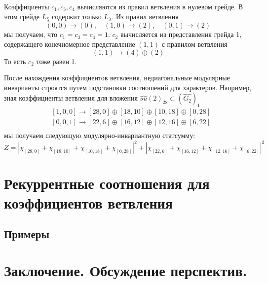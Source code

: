 \documentclass[a4paper,12pt]{article}
\theoremstyle{definition} \newtheorem{Def}{Definition}
\begin{document}
Коэффициенты $c_1, c_3, c_4$ вычисляются из правил ветвления в нулевом грейде. В этом грейде $L_{\hat\lambda}$ содержит только $L_{\lambda}$. Из правил ветвления
\begin{equation}
  \label{eq:18}
  (0,0)\to (0),\quad (1,0)\to (2),\quad (0,1)\to (2)
\end{equation}
мы получаем, что $c_1=c_3=c_4=1$. $c_2$ вычисляется из представления грейда 1, содержащего конечномерное представление $(1,1)$ с правилом ветвления
\begin{equation}
  \label{eq:19}
  (1,1)\to (4)\oplus (2)
\end{equation}
То есть $c_2$ тоже равен 1.

После нахождения коэффициентов ветвления, недиагональные модулярные инварианты строятся путем подстановки соотношений для характеров. Например, зная коэффициенты ветвления для вложения $\hat{su}(2)_{28}\subset (\hat{G_2})_1$
  \begin{equation}
    \label{eq:20}
    \begin{aligned}
      & [1,0,0]\to [28,0]\oplus [18,10]\oplus [10,18]\oplus [0,28]\\
      & [0,0,1]\to [22,6]\oplus [16,12]\oplus [12,16]\oplus [6,22]\\
    \end{aligned}
  \end{equation}
мы получаем следующую модулярно-инвариантную статсумму:
\begin{equation}
  \label{eq:21}
  Z=\left|\chi_{[28,0]}+\chi_{[18,10]}+\chi_{[10,18]}+\chi_{[0,28]}\right|^2+\left|\chi_{[22,6]}+\chi_{[16,12]}+\chi_{[12,16]}+\chi_{[6,22]}\right|^2
\end{equation}

\section{Рекуррентные соотношения для коэффициентов ветвления}
\label{sec:branching}

\subsection{Примеры}
\label{sec:examples}

\section{Заключение. Обсуждение перспектив.}
\label{sec:conlusion}
\end{document}
